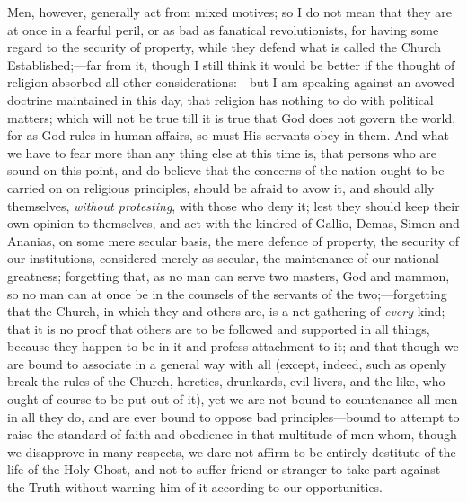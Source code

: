 Men, however, generally act from mixed motives; so I do not mean
that they are at once in a fearful peril, or as bad as fanatical
revolutionists, for having some regard to the security of property,
while they defend what is called the Church Established;—far from
it, though I still think it would be better if the thought of religion
absorbed all other considerations:—but I am speaking against an
avowed doctrine maintained in this day, that religion has nothing to
do with political matters; which will not be true till it is true that
God does not govern the world, for as God rules in human affairs, so
must His servants obey in them. And what we have to fear more than any
thing else at this time is, that persons who are sound on this point,
and do believe that the concerns of the nation ought to be carried on
on religious principles, should be afraid to avow it, and should ally
themselves, \emph{without protesting}, with those who deny it; lest
they should keep their own opinion to themselves, and act with the
kindred of Gallio, Demas, Simon and Ananias, on some mere secular
basis, the mere defence of property, the security of our institutions,
considered merely as secular, the maintenance of our national
greatness; forgetting that, as no man can serve two masters, God and
mammon, so no man can at once be in the counsels of the servants of
the two;—forgetting that the Church, in which they and others are,
is a net gathering of \emph{every} kind; that it is no proof that
others are to be followed and supported in all things, because they
happen to be in it and profess attachment to it; and that though we
are bound to associate in a general way with all (except, indeed, such
as openly break the rules of the Church, heretics, drunkards, evil
livers, and the like, who ought of course to be put out of it), yet we
are not bound to countenance all men in all they do, and are ever
bound to oppose bad principles—bound to attempt to raise the
standard of faith and obedience in that multitude of men whom, though
we disapprove in many respects, we dare not affirm to be entirely
destitute of the life of the Holy Ghost, and not to suffer friend or
stranger to take part against the Truth without warning him of it
according to our opportunities.

